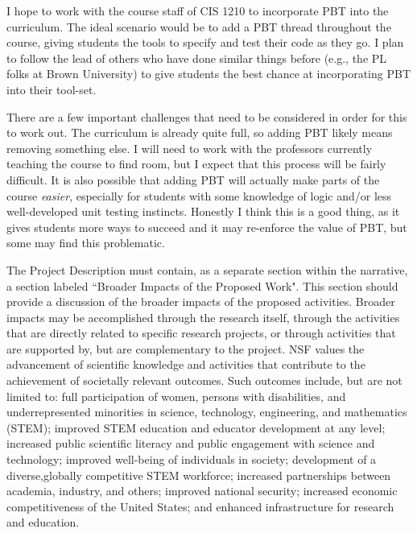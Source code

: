I hope to work with the course staff of CIS 1210 to incorporate PBT into the
curriculum. The ideal scenario would be to add a PBT thread throughout the
course, giving students the tools to specify and test their code as they go.  I
plan to follow the lead of others who have done similar things before (e.g., the
PL folks at Brown University) to give students the best chance at incorporating
PBT into their tool-set.

There are a few important challenges that need to be considered in order for
this to work out.  The curriculum is already quite full, so adding PBT likely
means removing something else. I will need to work with the professors currently
teaching the course to find room, but I expect that this process will be fairly
difficult. It is also possible that adding PBT will actually make parts of the
course {\em easier}, especially for students with some knowledge of logic and/or
less well-developed unit testing instincts. Honestly I think this is a good
thing, as it gives students more ways to succeed and it may re-enforce the value
of PBT, but some may find this problematic.

\label{sec:plan-of-work}


\label{sec:broader-impacts}
The Project Description must contain, as a separate section within the narrative, a section labeled ``Broader
Impacts of the Proposed Work". This section should provide a discussion of the broader impacts of the proposed
activities. Broader impacts may be accomplished through the research itself, through the activities that are
directly related to specific research projects, or through activities that are supported by, but are complementary to
the project. NSF values the advancement of scientific knowledge and activities that contribute to the
achievement of societally relevant outcomes. Such outcomes include, but are not limited to: full
participation of women, persons with disabilities, and underrepresented minorities in science, technology, engineering, and
mathematics (STEM); improved STEM education and educator development at any level; increased public
scientific literacy and public engagement with science and technology; improved well-being of individuals in
society; development of a diverse,globally competitive STEM workforce; increased partnerships between
academia, industry, and others; improved national security; increased economic competitiveness of the United
States; and enhanced infrastructure for research and education.

